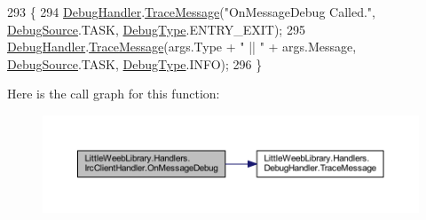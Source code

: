 \begin{DoxyCode}
293         \{
294             \mbox{\hyperlink{class_little_weeb_library_1_1_handlers_1_1_irc_client_handler_ab50ece494948d25db1839f4d6eab038f}{DebugHandler}}.\mbox{\hyperlink{interface_little_weeb_library_1_1_handlers_1_1_i_debug_handler_a2e405bc3492e683cd3702fae125221bc}{TraceMessage}}(\textcolor{stringliteral}{"OnMessageDebug Called."}, 
      \mbox{\hyperlink{namespace_little_weeb_library_1_1_handlers_a2a6ca0775121c9c503d58aa254d292be}{DebugSource}}.TASK, \mbox{\hyperlink{namespace_little_weeb_library_1_1_handlers_ab66019ed40462876ec4e61bb3ccb0a62}{DebugType}}.ENTRY\_EXIT);
295             \mbox{\hyperlink{class_little_weeb_library_1_1_handlers_1_1_irc_client_handler_ab50ece494948d25db1839f4d6eab038f}{DebugHandler}}.\mbox{\hyperlink{interface_little_weeb_library_1_1_handlers_1_1_i_debug_handler_a2e405bc3492e683cd3702fae125221bc}{TraceMessage}}(args.Type + \textcolor{stringliteral}{" || "} + args.Message, 
      \mbox{\hyperlink{namespace_little_weeb_library_1_1_handlers_a2a6ca0775121c9c503d58aa254d292be}{DebugSource}}.TASK, \mbox{\hyperlink{namespace_little_weeb_library_1_1_handlers_ab66019ed40462876ec4e61bb3ccb0a62}{DebugType}}.INFO);
296         \}
\end{DoxyCode}
Here is the call graph for this function\+:\nopagebreak
\begin{figure}[H]
\begin{center}
\leavevmode
\includegraphics[width=350pt]{class_little_weeb_library_1_1_handlers_1_1_irc_client_handler_a2b48c617972be0b3079a262ffc8141f6_cgraph}
\end{center}
\end{figure}
\mbox{\label{class_little_weeb_library_1_1_handlers_1_1_irc_client_handler_a8ffa9ba31b96d32a4c1fdafc04afaf5e}} 
